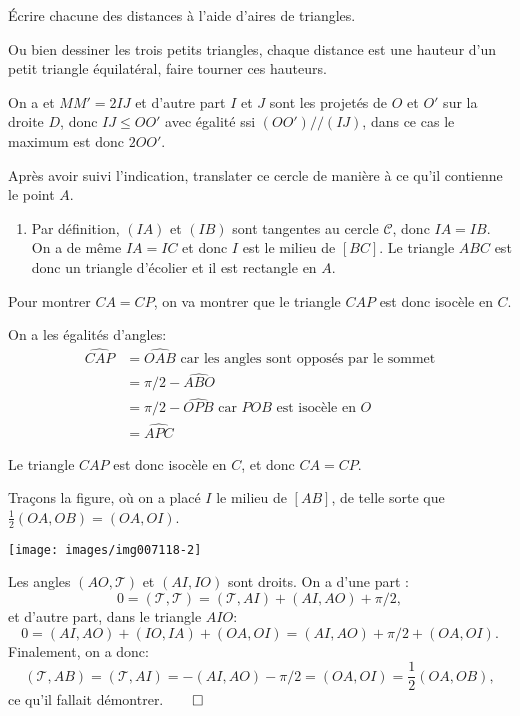\begin{Soln}{75}
\'Ecrire chacune des distances à l'aide d'aires de triangles.

Ou bien dessiner les trois petits triangles, chaque distance est une hauteur d'un petit triangle équilatéral, faire tourner ces hauteurs.
\end{Soln}
\begin{Soln}{76}
On a et $MM' = 2IJ$ et d'autre part $I$ et $J$ sont les projetés de $O$ et $O'$ sur la droite $D$, donc $IJ \leq OO'$ avec égalité ssi $(OO') // (IJ)$, dans ce cas le maximum est donc $2OO'$.
\end{Soln}
\begin{Soln}{81}
Après avoir suivi l'indication, translater ce cercle de manière à ce qu'il contienne le point $A$.
\end{Soln}
\begin{Soln}{82}
\begin{enumerate}
\item Par définition, $(IA)$ et $(IB)$ sont tangentes au cercle $\mathcal C$, donc $IA=IB$. On a de même $IA=IC$ et donc $I$ est le milieu de $[BC]$. Le triangle $ABC$ est donc un triangle d'écolier et il est rectangle en $A$.
\end{enumerate}
\end{Soln}
\begin{Soln}{83}

Pour montrer $CA=CP$, on va montrer que le triangle $CAP$ est donc isocèle en $C$.

On a les égalités d'angles:
\begin{align*}
\widehat{CAP} &= \widehat{OAB} \text{ car les angles sont opposés par le sommet}\\
&= \pi/2 - \widehat{ABO} \\
&= \pi/2 -\widehat{OPB}  \text{ car $POB$ est isocèle en $O$}\\
&= \widehat{APC}
\end{align*}

Le triangle $CAP$ est donc isocèle en $C$, et donc $CA=CP$.
\end{Soln}
\begin{Soln}{85}
Traçons la figure, où on a placé $I$ le milieu de $[AB]$, de telle sorte que $\frac12(OA,OB)=(OA,OI)$.

\begin{center}
\texttt{[image: images/img007118-2]}
\end{center}


Les angles $(AO,\mathcal T)$ et $(AI,IO)$ sont droits.
On a d'une part :
\[ 0=(\mathcal T,\mathcal T) =  (\mathcal T,AI) +(AI,AO)+ \pi/2, \]
et d'autre part, dans le triangle $AIO$:
\[ 0=(AI,AO)+(IO,IA)+(OA,OI)=(AI,AO)+\pi/2+(OA,OI).\]
Finalement, on a donc:
\[ (\mathcal T,AB) = (\mathcal T, AI) = -(AI,AO)-\pi/2 = (OA,OI)=\frac{1}{2}(OA,OB),\]
ce qu'il fallait démontrer.$\qed$
\end{Soln}
